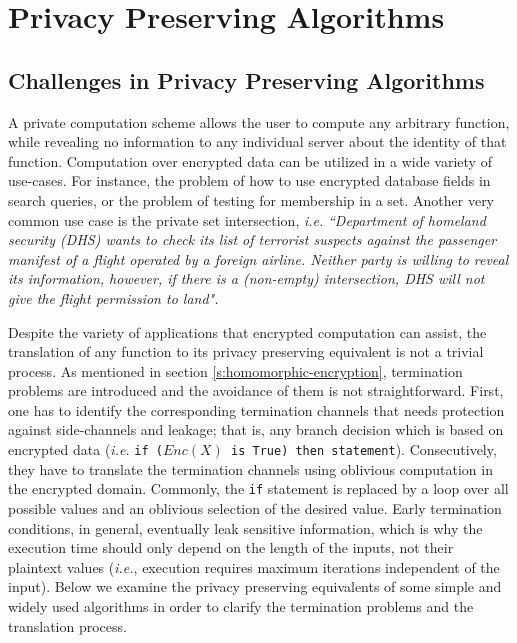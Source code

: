 \chapter{Privacy Preserving Algorithms}\label{c:pp-algorithms}

\section{Challenges in Privacy Preserving Algorithms}\label{s:challenges}
A private computation scheme allows the user to compute any arbitrary function, while revealing no information to any individual server about the identity of that function.
Computation over encrypted data can be utilized in a wide variety of use-cases.
For instance, the problem of how to use encrypted database fields in search queries, or the problem of testing for membership in a set.
Another very common use case is the private set intersection, \textit{i.e.} \textit{``Department of homeland security (DHS) wants to check its list of terrorist suspects against the passenger manifest of a flight operated by a foreign airline.
Neither party is willing to reveal its information, however, if there is a (non-empty) intersection, DHS will not give the flight permission to land".}


Despite the variety of applications that encrypted computation can assist, the translation of any function to its privacy preserving equivalent is not a trivial process.
As mentioned in section \ref{s:homomorphic-encryption}, termination problems are introduced and the avoidance of them is not straightforward.
First, one has to identify the corresponding termination channels that needs protection against side-channels and leakage; that is, any branch decision which is based on encrypted data (\textit{i.e.} \texttt{if ($Enc(X)$ is True) then statement}).
Consecutively, they have to translate the termination channels using oblivious computation in the encrypted domain.
Commonly, the \texttt{if} statement is replaced by a loop over all possible values and an oblivious selection of the desired value.
Early termination conditions, in general, eventually leak sensitive information, which is why the execution time should only depend on the length of the inputs, not their plaintext values (\textit{i.e.}, execution requires maximum iterations independent of the input).
Below we examine the privacy preserving equivalents of some simple and widely used algorithms in order to clarify the termination problems and the translation process.


